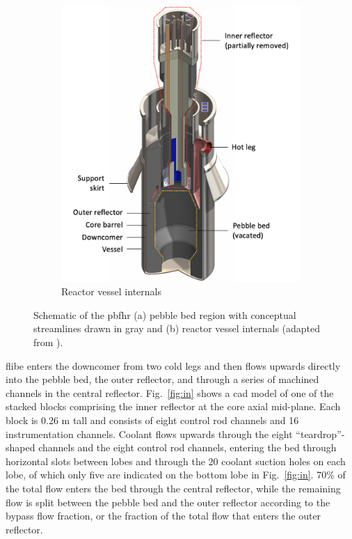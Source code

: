 \begin{figure}[h!]
\begin{subfigure}{0.5\linewidth}
        \includegraphics[height=1.1\linewidth]{figs/pbfhr_cad_core.png}
        \caption{Reactor vessel internals}
        \label{fig:pbfhr_core2}
    \end{subfigure}
    \caption{Schematic of the \gls{pbfhr} (a) pebble bed region with conceptual streamlines drawn in gray and (b) reactor vessel internals (adapted from \cite{pbfhr, krumwiede}).}
    \label{fig:pbfhr_big}
\end{figure}

\gls{flibe} enters the downcomer from two cold legs and then flows upwards directly into the pebble bed, the outer reflector, and through a series of machined channels in the central reflector. Fig.\ \ref{fig:in} shows a \gls{cad} model of one of the stacked blocks comprising the inner reflector at the core axial mid-plane. Each block is 0.26 \si{\meter} tall and consists of eight control rod channels and 16 instrumentation channels. Coolant flows upwards through the eight ``teardrop''-shaped channels and the eight control rod channels, entering the bed through horizontal slots between lobes and through the 20 coolant suction holes on each lobe, of which only five are indicated on the bottom lobe in Fig.\ \ref{fig:in}. 70\% of the total flow enters the bed through the central reflector, while the remaining flow is split between the pebble bed and the outer reflector according to the bypass flow fraction, or the fraction of the total flow that enters the outer reflector. 

